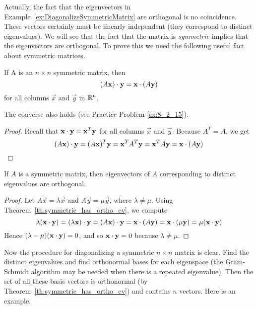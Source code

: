 \documentclass{ximera}
\begin{document}
Actually, the fact that the eigenvectors in Example~\ref{ex:DiagonalizeSymmetricMatrix} are orthogonal is no coincidence. These vectors certainly must be linearly independent (they correspond to distinct eigenvalues).  We will see that the fact that the matrix is \textit{symmetric} implies that the eigenvectors are orthogonal. To prove this we need the following useful fact about symmetric matrices.

\begin{theorem}\label{th:dotpSymmetric}
If A is an $n \times n$ symmetric matrix, then
\begin{equation*}
(A\mathbf{x}) \cdot \mathbf{y} = \mathbf{x} \cdot (A\mathbf{y})
\end{equation*}
for all columns $\vec{x}$ and $\vec{y}$ in $\mathbb{R}^n$.
\end{theorem}
\begin{remark}
The converse also holds (see Practice Problem \ref{ex:8_2_15}).
\end{remark}

\begin{proof}
Recall that $\mathbf{x} \cdot \mathbf{y} = \mathbf{x}^{T} \mathbf{y}$ for all columns $\vec{x}$ and $\vec{y}$. Because $A^{T} = A$, we get
\begin{equation*}
(A\mathbf{x}) \cdot \mathbf{y} = (A\mathbf{x})^T\mathbf{y} = \mathbf{x}^TA^T\mathbf{y} =  \mathbf{x}^TA\mathbf{y} = \mathbf{x} \cdot (A\mathbf{y})
\end{equation*}
\end{proof}

\begin{theorem}\label{th:symmetric_has_ortho_ev}
If $A$ is a symmetric matrix, then eigenvectors of $A$ corresponding to distinct eigenvalues are orthogonal.
\end{theorem}

\begin{proof}
Let $A\vec{x} = \lambda \vec{x}$ and $A\vec{y} = \mu \vec{y}$, where $\lambda \neq \mu$. Using Theorem~\ref{th:symmetric_has_ortho_ev}, we compute
\begin{equation*}
\lambda(\mathbf{x} \cdot \mathbf{y}) = (\lambda\mathbf{x}) \cdot \mathbf{y} = (A\mathbf{x}) \cdot \mathbf{y} = \mathbf{x} \cdot (A\mathbf{y}) = \mathbf{x} \cdot (\mu\mathbf{y}) = \mu(\mathbf{x} \cdot \mathbf{y})
\end{equation*}
Hence $(\lambda - \mu)(\mathbf{x} \cdot \mathbf{y}) = 0$, and so $\mathbf{x} \cdot \mathbf{y} = 0$ because $\lambda \neq \mu$.
\end{proof}

Now the procedure for diagonalizing a symmetric $n \times n$ matrix is clear. Find the distinct eigenvalues
 and find orthonormal bases for each eigenspace (the Gram-Schmidt
algorithm may be needed when there is a repeated eigenvalue). Then the set of all these basis vectors is
orthonormal (by Theorem~\ref{th:symmetric_has_ortho_ev}) and contains $n$ vectors. Here is an example.
\end{document}
